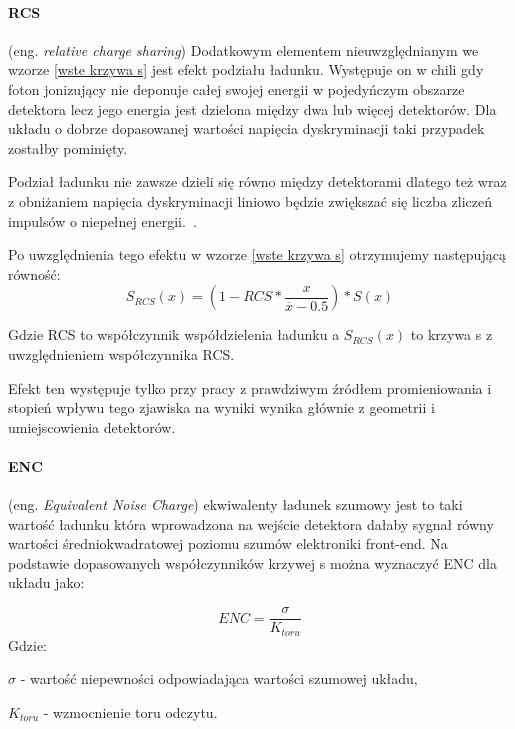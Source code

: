 \paragraph{RCS}
(eng. \textit{relative charge sharing})
Dodatkowym elementem nieuwzględnianym we wzorze \ref{wste krzywa s} jest efekt podziału ładunku. Występuje on w chili gdy foton jonizujący nie deponuje całej swojej energii w pojedyńczym obszarze detektora lecz jego energia jest dzielona między dwa lub więcej detektorów. Dla układu o dobrze dopasowanej wartości napięcia dyskryminacji taki przypadek zostałby pominięty.

Podział ładunku nie zawsze dzieli się równo między detektorami dlatego też wraz z obniżaniem napięcia dyskryminacji liniowo będzie zwiększać się liczba zliczeń impulsów o niepełnej energii.~\cite{Monika mag}. 

Po uwzględnienia tego efektu w wzorze \ref{wste krzywa s} otrzymujemy następującą równość:
\begin{equation}
        \label{wstep rcs}
        S_{RCS}(x) = (1-RCS * \frac{x}{\overline{x} - 0.5}) * S(x)
\end{equation}

Gdzie RCS to współczynnik współdzielenia ładunku a $S_{RCS}(x)$ to krzywa s z uwzględnieniem współczynnika RCS.

Efekt ten występuje tylko przy pracy z prawdziwym źródłem promieniowania i stopień wpływu tego zjawiska na wyniki wynika głównie z geometrii i umiejscowienia detektorów.

\paragraph{ENC}
 (eng. \textit{Equivalent Noise Charge}) ekwiwalenty ładunek szumowy jest to taki wartość ładunku która wprowadzona na wejście detektora dałaby sygnał równy wartości średniokwadratowej poziomu szumów elektroniki front-end. Na podstawie dopasowanych współczynników krzywej s można wyznaczyć ENC dla układu jako: 

 \begin{equation}
         ENC = \frac{\sigma}{K_{toru}}
 \end{equation}
 Gdzie:
 \begin{description}
        \item  $\sigma$ - wartość niepewności odpowiadająca wartości szumowej układu, 
        \item $K_{toru}$ - wzmocnienie toru odczytu.
 \end{description}

